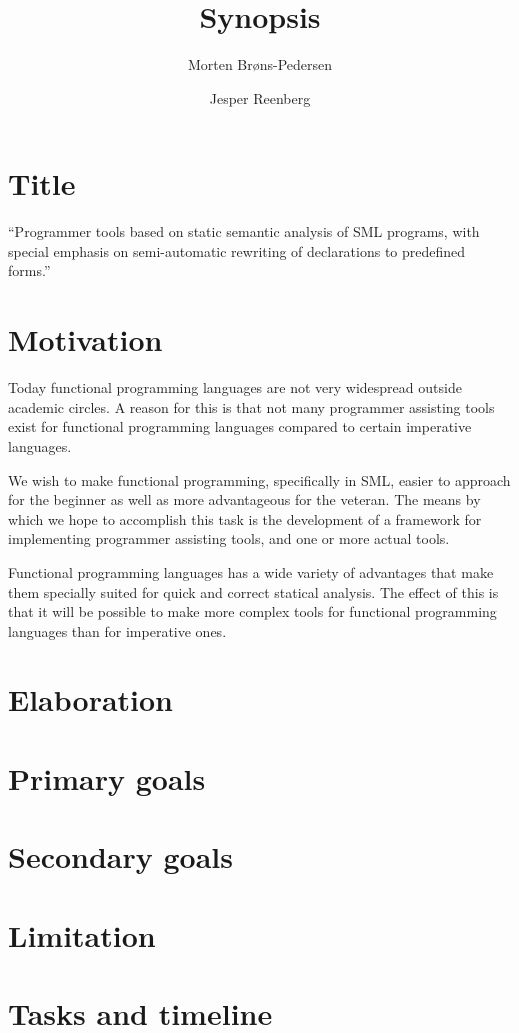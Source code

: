 \documentclass[a4paper,11pt,fleqn]{article}
\author{Morten Brøns-Pedersen \and Jesper Reenberg}
\title{Synopsis}
\begin{document}
\maketitle

\section{Title}
``Programmer tools based on static semantic analysis of SML programs, with special emphasis on
semi-automatic rewriting of declarations to predefined forms.''

\section{Motivation}
Today functional programming languages are not very widespread outside academic circles. A reason
for this is that not many programmer assisting tools exist for functional programming languages
compared to certain imperative languages.

We wish to make functional programming, specifically in SML, easier to approach for the beginner as
well as more advantageous for the veteran. The means by which we hope to accomplish this task is the
development of a framework for implementing programmer assisting tools, and one or more actual
tools.

Functional programming languages has a wide variety of advantages that make them specially suited
for quick and correct statical analysis. The effect of this is that it will be possible to make more
complex tools for functional programming languages than for imperative ones.

\section{Elaboration}

\section{Primary goals}

\section{Secondary goals}

\section{Limitation}

\section{Tasks and timeline}
\end{document}
